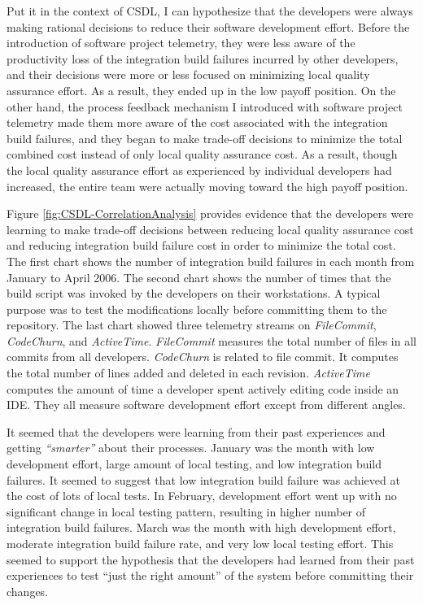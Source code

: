 Put it in the context of CSDL, I can hypothesize that the developers were always making rational decisions to reduce their software development effort. Before the introduction of software project telemetry, they were less aware of the productivity loss of the integration build failures incurred by other developers, and their decisions were more or less focused on minimizing local quality assurance effort. As a result, they ended up in the low payoff position. On the other hand, the process feedback mechanism I introduced with software project telemetry made them more aware of the cost associated with the integration build failures, and they began to make trade-off decisions to minimize the total combined cost instead of only local quality assurance cost. As a result, though the local quality assurance effort as experienced by individual developers had increased, the entire team were actually moving toward the high payoff position. 

Figure \ref{fig:CSDL-CorrelationAnalysis} provides evidence that the developers were learning to make trade-off decisions between reducing local quality assurance cost and reducing integration build failure cost in order to minimize the total cost.
The first chart shows the number of integration build failures in each month from January to April 2006. 
The second chart shows the number of times that the build script was invoked by the developers on their workstations. A typical purpose was to test the modifications locally before committing them to the repository.
The last chart showed three telemetry streams on \textit{FileCommit}, \textit{CodeChurn}, and \textit{ActiveTime}. \textit{FileCommit} measures the total number of files in all commits from all developers. \textit{CodeChurn} is related to file commit. It computes the total number of lines added and deleted in each revision. \textit{ActiveTime} computes the amount of time a developer spent actively editing code inside an IDE. They all measure software development effort except from different angles.

It seemed that the developers were learning from their past experiences and getting \textit{``smarter''} about their processes. January was the month with low development effort, large amount of local testing, and low integration build failures. It seemed to suggest that low integration build failure was achieved at the cost of lots of local tests. In February, development effort went up with no significant change in local testing pattern, resulting in higher number of integration build failures. March was the month with high development effort, moderate integration build failure rate, and very low local testing effort. This seemed to support the hypothesis that the developers had learned from their past experiences to test ``just the right amount'' of the system before committing their changes.

